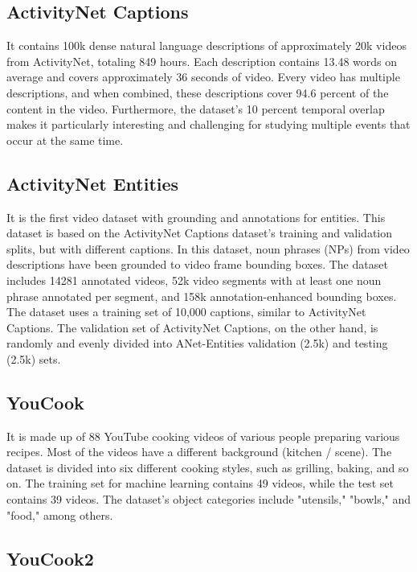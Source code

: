\subsection{ActivityNet Captions}

\par It contains 100k dense natural language descriptions of approximately 20k videos from ActivityNet, totaling 849 hours. Each description contains 13.48 words on average and covers approximately 36 seconds of video. Every video has multiple descriptions, and when combined, these descriptions cover 94.6 percent of the content in the video. Furthermore, the dataset's 10 percent temporal overlap makes it particularly interesting and challenging for studying multiple events that occur at the same time. 

\subsection{ActivityNet Entities}

\par It is the first video dataset with grounding and annotations for entities. This dataset is based on the ActivityNet Captions dataset's training and validation splits, but with different captions. In this dataset, noun phrases (NPs) from video descriptions have been grounded to video frame bounding boxes. The dataset includes 14281 annotated videos, 52k video segments with at least one noun phrase annotated per segment, and 158k annotation-enhanced bounding boxes. The dataset uses a training set of 10,000 captions, similar to ActivityNet Captions. The validation set of ActivityNet Captions, on the other hand, is randomly and evenly divided into ANet-Entities validation (2.5k) and testing (2.5k) sets.

\subsection{YouCook}

\par It is made up of 88 YouTube cooking videos of various people preparing various recipes. Most of the videos have a different background (kitchen / scene). The dataset is divided into six different cooking styles, such as grilling, baking, and so on. The training set for machine learning contains 49 videos, while the test set contains 39 videos. The dataset's object categories include "utensils," "bowls," and "food," among others.

\subsection{YouCook2}

